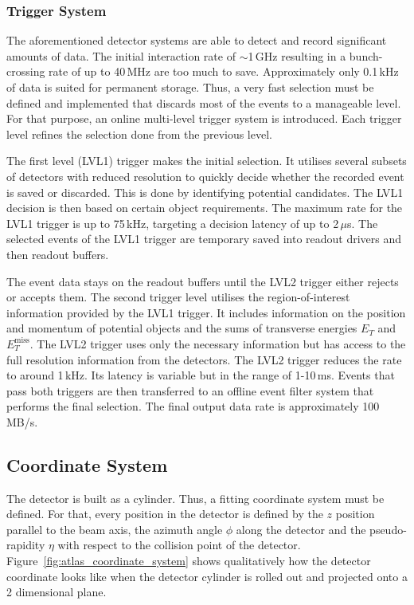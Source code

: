 \documentclass[bachelor,ngerman,english]{GAUBM}
\begin{document}
\subsubsection*{Trigger System}
The aforementioned detector systems are able to detect and record significant amounts of data. The initial interaction rate of $\sim$1\,GHz resulting in a bunch-crossing rate of up to 40\,MHz \cite{atlas:tech_design_report_01} are too much to save. Approximately only 0.1\,kHz of data is suited for permanent storage. Thus, a very fast selection must be defined and implemented that discards most of the events to a manageable level. For that purpose, an online multi-level trigger system is introduced. Each trigger level refines the selection done from the previous level.

The first level (LVL1) trigger \cite{atlas:tech_design_report_01,atlas:trigger_lvl_1} makes the initial selection. It utilises several subsets of detectors with reduced resolution to quickly decide whether the recorded event is saved or discarded. This is done by identifying potential candidates. The LVL1 decision is then based on certain object requirements. The maximum rate for the LVL1 trigger is up to 75\,kHz, targeting a decision latency of up to 2\,$\mu$s. The selected events of the LVL1 trigger are temporary saved into readout drivers and then readout buffers. 

The event data stays on the readout buffers until the LVL2 trigger \cite{atlas:tech_design_report_01,atlas:trigger_lvl_high} either rejects or accepts them. The second trigger level utilises the region-of-interest information provided by the LVL1 trigger. It includes information on the position and momentum of potential objects and the sums of transverse energies $E_T$ and $E_T^\text{miss}$. The LVL2 trigger uses only the necessary information but has access to the full resolution information from the detectors. The LVL2 trigger reduces the rate to around 1\,kHz. Its latency is variable but in the range of 1-10\,ms. Events that pass both triggers are then transferred to an offline event filter system that performs the final selection. The final output data rate is approximately 100\,MB/s.


\subsection{Coordinate System}
\label{sec:exp:atlas_coordinate_system}
The \atlas detector is built as a cylinder. Thus, a fitting coordinate system must be defined. For that, every position in the detector is defined by the $z$ position parallel to the beam axis, the azimuth angle $\phi$ along the detector and the pseudo-rapidity $\eta$ with respect to the collision point of the detector. Figure~\ref{fig:atlas_coordinate_system} shows qualitatively how the detector coordinate looks like when the detector cylinder is rolled out and projected onto a 2 dimensional plane. 
\end{document}

